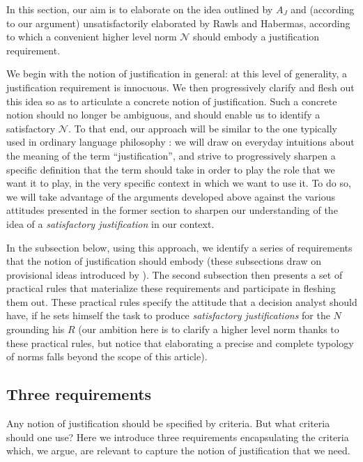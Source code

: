 \documentclass[preprint, french, english, 11pt, authoryear]{elsarticle}%
\newcommand{\adv}{\mathscr{N}}
\begin{document}
In this section, our aim is to elaborate on the idea outlined by $A_J$ and (according to our argument) unsatisfactorily elaborated by Rawls and Habermas, according to which a convenient higher level norm $\adv$ should embody a justification requirement.

We begin with the notion of justification in general: at this level of generality, a justification requirement is innocuous. 
We then progressively clarify and flesh out this idea so as to articulate a concrete notion of justification. Such a concrete notion should no longer be ambiguous, and should enable us to identify a satisfactory $\adv$. 
To that end, our approach will be similar to the one typically used in ordinary language philosophy \citep{soames_philosophical_2003}: 
we will draw on everyday intuitions about the meaning of the term ``justification'', and strive to progressively sharpen a specific definition that the term should take in order to play the role that we want it to play, in the very specific context in which we want to use it. 
To do so, we will take advantage of the arguments developed above against the various attitudes presented in the former section to sharpen our understanding of the idea of a \emph{satisfactory justification} in our context.

In the subsection below, using this approach, we identify a series of requirements that the notion of justification should embody (these subsections draw on provisional ideas introduced by \citet{meinard_du_2013, meinard_what_2017}). 
The second subsection then presents a set of practical rules that materialize these requirements and participate in fleshing them out. These practical rules specify the attitude that a decision analyst should have, if he sets himself the task to produce \emph{satisfactory justifications} for the $N$ grounding his $R$ (our ambition here is to clarify a higher level norm thanks to these practical rules, but notice that elaborating a precise and complete typology of norms falls beyond the scope of this article).

\subsection{Three requirements}
Any notion of justification should be specified by criteria. But what criteria should one use? Here we introduce three requirements encapsulating the criteria which, we argue, are relevant to capture the notion of justification that we need.
\end{document}
